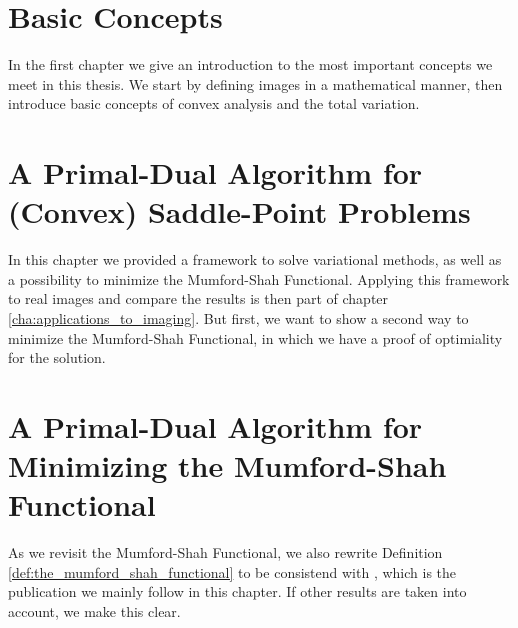 \documentclass{scrreprt}
\begin{document}





\chapter{Basic Concepts} %
\label{cha:basic_concepts}

    In the first chapter we give an introduction to the most important concepts we meet in this thesis. We start by defining images in a mathematical manner, then introduce basic concepts of convex analysis and the total variation.

    
    
    


\chapter{A Primal-Dual Algorithm for (Convex) Saddle-Point Problems} %
\label{cha:a_first_order_primal_dual_algorithm_for_convex_saddle_point_problems}
    
    
    
    
    
    
    

    In this chapter we provided a framework to solve variational methods, as well as a possibility to minimize the Mumford-Shah Functional. Applying this framework to real images and compare the results is then part of chapter \ref{cha:applications_to_imaging}. But first, we want to show a second way to minimize the Mumford-Shah Functional, in which we have a proof of optimiality for the solution.


\chapter{A Primal-Dual Algorithm for Minimizing the Mumford-Shah Functional} %
\label{cha:a_first_order_primal_dual_algorithm_for_minimizing_the_mumford_shah_functional}

    As we revisit the Mumford-Shah Functional, we also rewrite Definition \ref{def:the_mumford_shah_functional} to be consistend with \cite{Pock-et-al-iccv09}, which is the publication we mainly follow in this chapter. If other results are taken into account, we make this clear.
\end{document}
